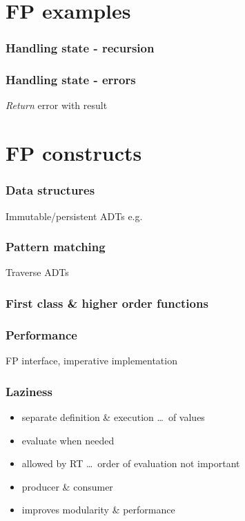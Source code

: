 \documentclass[xcolor={dvipsnames}]{beamer}
\begin{document}
\section{FP examples}

\begin{frame}[fragile]
  \frametitle{Handling state - recursion}
   {
    
  }
   {
    
  }
\end{frame}

\begin{frame}
  \frametitle{Handling state - errors}
  \textit{Return} error with result
  
\end{frame}

\section{FP constructs}

\begin{frame}
  \frametitle{Data structures}
  Immutable/persistent ADTs e.g.
  
\end{frame}

\begin{frame}
  \frametitle{Pattern matching}
  Traverse ADTs
  
\end{frame}

\begin{frame}
  \frametitle{First class \& higher order functions}
  
\end{frame}

\begin{frame}
  \frametitle{Performance}
  FP interface, imperative implementation
  
\end{frame}

\begin{frame}
  \frametitle{Laziness}
  \begin{itemize}
    \item<1-> separate definition \& execution \ldots\ of values
    \item<2-> evaluate when needed
    \item<3-> allowed by RT \ldots\ order of evaluation not important
    \item<4-> producer \& consumer
    \item<5-> improves modularity \& performance
  \end{itemize}
\end{frame}
\end{document}
